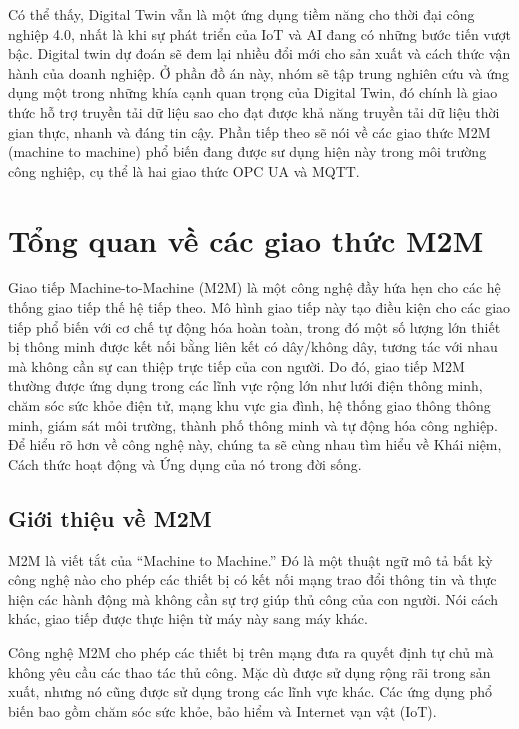 Có thể thấy, Digital Twin vẫn là một ứng dụng tiềm năng cho thời đại công nghiệp 4.0, nhất là khi sự phát triển của IoT và AI đang có những bước tiến vượt bậc. Digital twin dự đoán sẽ đem lại nhiều đổi mới cho sản xuất và cách thức vận hành của doanh nghiệp. Ở phần đồ án này, nhóm sẽ tập trung nghiên cứu và ứng dụng một trong những khía cạnh quan trọng của Digital Twin, đó chính là giao thức hỗ trợ truyền tải dữ liệu sao cho đạt được khả năng truyền tải dữ liệu thời gian thực, nhanh và đáng tin cậy. Phần tiếp theo sẽ nói về các giao thức M2M (machine to machine) phổ biến đang được sư dụng hiện này trong môi trường công nghiệp, cụ thể là hai giao thức OPC UA và MQTT.

\section{Tổng quan về các giao thức M2M} 

Giao tiếp Machine-to-Machine (M2M) là một công nghệ đầy hứa hẹn cho các hệ thống giao tiếp thế hệ tiếp theo. Mô hình giao tiếp này tạo điều kiện cho các giao tiếp phổ biến với cơ chế tự động hóa hoàn toàn, trong đó một số lượng lớn thiết bị thông minh được kết nối bằng liên kết có dây/không dây, tương tác với nhau mà không cần sự can thiệp trực tiếp của con người. Do đó, giao tiếp M2M thường được ứng dụng trong các lĩnh vực rộng lớn như lưới điện thông minh, chăm sóc sức khỏe điện tử, mạng khu vực gia đình, hệ thống giao thông thông minh, giám sát môi trường, thành phố thông minh và tự động hóa công nghiệp. Để hiểu rõ hơn về công nghệ này, chúng ta sẽ cùng nhau tìm hiểu về Khái niệm, Cách thức hoạt động và Ứng dụng của nó trong đời sống.

\subsection{Giới thiệu về M2M}
M2M là viết tắt của “Machine to Machine.” Đó là một thuật ngữ mô tả bất kỳ công nghệ nào cho phép các thiết bị có kết nối mạng trao đổi thông tin và thực hiện các hành động mà không cần sự trợ giúp thủ công của con người. Nói cách khác, giao tiếp được thực hiện từ máy này sang máy khác.

Công nghệ M2M cho phép các thiết bị trên mạng đưa ra quyết định tự chủ mà không yêu cầu các thao tác thủ công. Mặc dù được sử dụng rộng rãi trong sản xuất, nhưng nó cũng được sử dụng trong các lĩnh vực khác. Các ứng dụng phổ biến bao gồm chăm sóc sức khỏe, bảo hiểm và Internet vạn vật (IoT).

